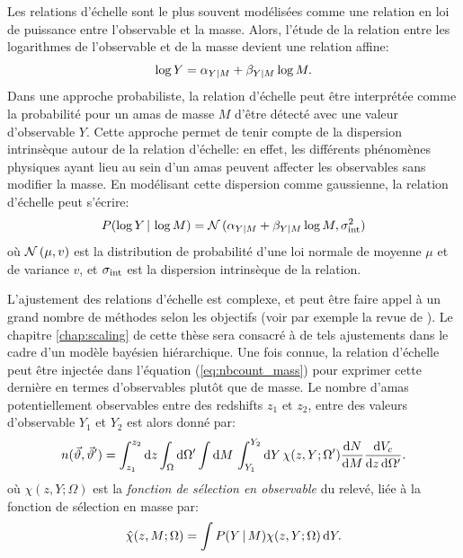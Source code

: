 Les relations d'échelle sont le plus souvent modélisées comme une relation en loi de puissance entre l'observable et la masse.
Alors, l'étude de la relation entre les logarithmes de l'observable et de la masse devient une relation affine:
\begin{equation}
    \label{eq:scaling_noproba}
    \log Y = \alpha_{Y|M} + \beta_{Y|M} \log M.
\end{equation}
Dans une approche probabiliste, la relation d'échelle peut être interprétée comme la probabilité pour un amas de masse $M$ d'être détecté avec une valeur d'observable $Y$.
Cette approche permet de tenir compte de la dispersion intrinsèque autour de la relation d'échelle: en effet, les différents phénomènes physiques ayant lieu au sein d'un amas peuvent affecter les observables sans modifier la masse.
En modélisant cette dispersion comme gaussienne, la relation d'échelle peut s'écrire:
\begin{equation}
    \label{eq:scaling_pdf}
    P(\log Y \,|\, \log M) = \mathcal{N}\,(\alpha_{Y|M} + \beta_{Y|M} \log M, \sigma_{\rm int}^2)
\end{equation}
où $\mathcal{N}\,(\mu, v)$ est la distribution de probabilité d'une loi normale de moyenne $\mu$ et de variance $v$, et $\sigma_{\rm int}$ est la dispersion intrinsèque de la relation.

L'ajustement des relations d'échelle est complexe, et peut être faire appel à un grand nombre de méthodes selon les objectifs (voir par exemple la revue de \cite{andreon_measurement_2013}).
Le chapitre \ref{chap:scaling} de cette thèse sera consacré à de tels ajustements dans le cadre d'un modèle bayésien hiérarchique.
Une fois connue, la relation d'échelle peut être injectée dans l'équation (\ref{eq:nbcount_mass}) pour exprimer cette dernière en termes d'observables plutôt que de masse.
Le nombre d'amas potentiellement observables entre des redshifts $z_1$ et $z_2$, entre des valeurs d'observable $Y_1$ et $Y_2$ est alors donné par:
\begin{equation}
    \label{eq:nbcount_obs}
    n(\vec{\vartheta}, \vec{\vartheta}')
    = \int_{z_1}^{z_2} \mathrm{d} z
      \int_\Omega \mathrm{d}\Omega'
      \int \mathrm{d} M \,
      \int_{Y_1}^{Y_2} \mathrm{d} Y \,
        \chi(z, Y; \Omega') \frac{\mathrm{d} N}{\mathrm{d} M} \frac{\mathrm{d} V_c}{\mathrm{d} z \, \mathrm{d}\Omega'}.
\end{equation}
où $\chi(z, Y; \Omega)$ est la \textit{fonction de sélection en observable} du relevé, liée à la fonction de sélection en masse par:
\begin{equation}
    \label{eq:nbcount_sel}
    \hat{\chi}(z, M ; \Omega) = \int P(Y \,|\, M) \chi(z, Y ; \Omega) \, \mathrm{d} Y.
\end{equation}

